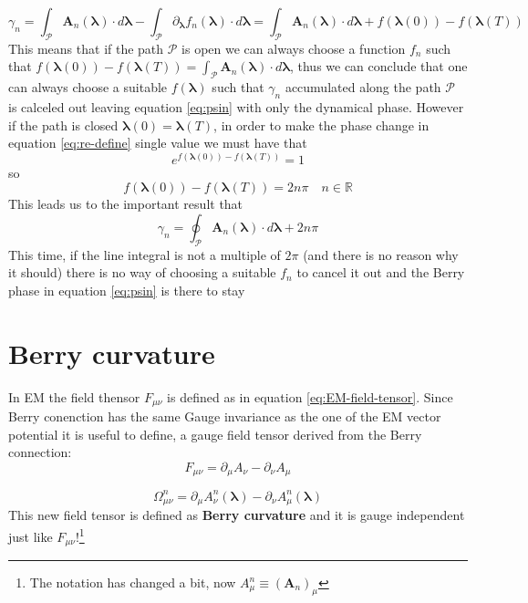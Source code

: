     \[
        \gamma_n=\int_\mathcal{P} \mathbf A_n(\boldsymbol \lambda) \cdot d\boldsymbol \lambda - \int_\mathcal{P} \partial_{\boldsymbol \lambda}f_n(\boldsymbol \lambda) \cdot d\boldsymbol \lambda= \int_\mathcal{P} \mathbf A_n(\boldsymbol \lambda) \cdot d\boldsymbol \lambda + f(\boldsymbol \lambda(0))-f(\boldsymbol \lambda (T))
    \]
    This means that if the path $\mathcal{P}$ is open we can always choose a function $f_n$ such that 
    $f(\boldsymbol \lambda(0))-f(\boldsymbol \lambda(T))=\int_\mathcal{P} \mathbf A_n(\boldsymbol \lambda) \cdot d\boldsymbol \lambda$, 
    thus we can conclude that one can always choose a suitable $f(\boldsymbol \lambda)$ such that $\gamma_n$ accumulated along the path $\mathcal P$ is calceled out leaving equation 
    \ref{eq:psin} with only the dynamical phase. 
    However if the path is closed $\boldsymbol \lambda(0)=\boldsymbol \lambda(T)$, in order to make the phase change
    in equation \ref{eq:re-define} single value we must have that
    \[
    e^{f(\boldsymbol \lambda(0))-f(\boldsymbol \lambda(T))}=1
    \]
    so 
    \[
        f(\boldsymbol \lambda(0))-f(\boldsymbol \lambda(T))=2n\pi \quad n\in \mathbb{R}
    \]
    This leads us to the important result that
    \begin{equation}
        \label{eq:closed-berry}
        \gamma_n=\oint_{\mathcal P} \mathbf A_n(\boldsymbol \lambda)\cdot d\boldsymbol \lambda + 2n\pi
    \end{equation}
    This time, if the line integral is not a multiple of $2\pi$ (and there is no reason why it should) there is no way of choosing a suitable $f_n$ to
    cancel it out and the Berry phase in equation \ref{eq:psin} is there to stay



\section{Berry curvature}
    In EM the field thensor $F_{\mu\nu}$ is defined as in equation \ref{eq:EM-field-tensor}.
    Since Berry conenction has the same Gauge invariance as the one of the EM vector potential it is useful to define, a gauge field tensor derived from the Berry connection:
    \begin{equation}
        \label{eq:EM-field-tensor}
        F_{\mu\nu}=\partial_\mu A_\nu-\partial_\nu A_\mu
    \end{equation}

    \begin{equation}
        \label{eq:berry-curvature1}
            \Omega_{\mu\nu}^n =\partial_\mu A^n_\nu(\boldsymbol \lambda) - \partial_\nu A^n_\mu(\boldsymbol \lambda)
    \end{equation}
    This new field tensor is defined as \textbf{Berry curvature} and it is gauge independent just like 
    $F_{\mu\nu}$!\footnote{The notation has changed a bit, now $A_\mu^n\equiv (\mathbf A_n)_\mu$}

